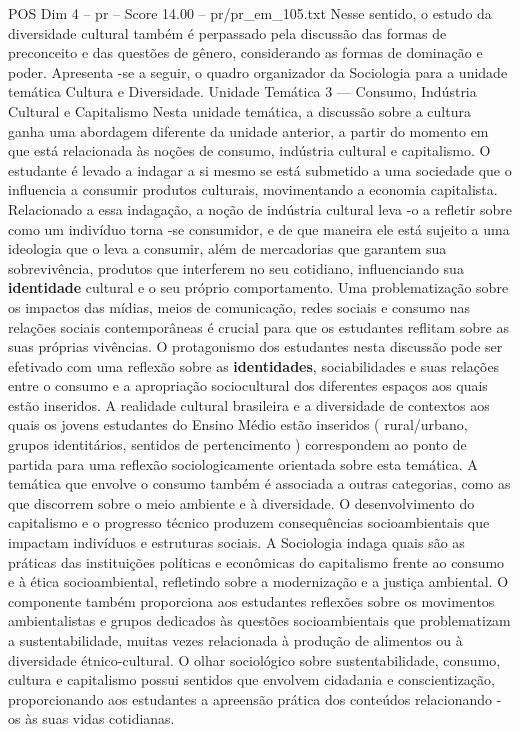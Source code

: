 \begin{textsample}{POS Dim 4 – pr – Score 14.00 – pr/pr\_em\_105.txt}
Nesse sentido, o estudo da diversidade cultural também é perpassado pela discussão das formas de preconceito e das questões de gênero, considerando as formas de dominação e poder.
Apresenta -se a seguir, o quadro organizador da Sociologia para a unidade temática Cultura e Diversidade.
Unidade Temática 3 — Consumo, Indústria Cultural e Capitalismo Nesta unidade temática, a discussão sobre a cultura ganha uma abordagem diferente da unidade anterior, a partir do momento em que está relacionada às noções de consumo, indústria cultural e capitalismo.
O estudante é levado a indagar a si mesmo se está submetido a uma sociedade que o influencia a consumir produtos culturais, movimentando a economia capitalista.
Relacionado a essa indagação, a noção de indústria cultural leva -o a refletir sobre como um indivíduo torna -se consumidor, e de que maneira ele está sujeito a uma ideologia que o leva a consumir, além de mercadorias que garantem sua sobrevivência, produtos que interferem no seu cotidiano, influenciando sua \textbf{identidade} cultural e o seu próprio comportamento.
Uma problematização sobre os impactos das mídias, meios de comunicação, redes sociais e consumo nas relações sociais contemporâneas é crucial para que os estudantes reflitam sobre as suas próprias vivências.
O protagonismo dos estudantes nesta discussão pode ser efetivado com uma reflexão sobre as \textbf{identidades}, sociabilidades e suas relações entre o consumo e a apropriação sociocultural dos diferentes espaços aos quais estão inseridos.
A realidade cultural brasileira e a diversidade de contextos aos quais os jovens estudantes do Ensino Médio estão inseridos ( rural/urbano, grupos identitários, sentidos de pertencimento ) correspondem ao ponto de partida para uma reflexão sociologicamente orientada sobre esta temática.
A temática que envolve o consumo também é associada a outras categorias, como as que discorrem sobre o meio ambiente e à diversidade.
O desenvolvimento do capitalismo e o progresso técnico produzem consequências socioambientais que impactam indivíduos e estruturas sociais.
A Sociologia indaga quais são as práticas das instituições políticas e econômicas do capitalismo frente ao consumo e à ética socioambiental, refletindo sobre a modernização e a justiça ambiental.
O componente também proporciona aos estudantes reflexões sobre os movimentos ambientalistas e grupos dedicados às questões socioambientais que problematizam a sustentabilidade, muitas vezes relacionada à produção de alimentos ou à diversidade étnico-cultural.
O olhar sociológico sobre sustentabilidade, consumo, cultura e capitalismo possui sentidos que envolvem cidadania e conscientização, proporcionando aos estudantes a apreensão prática dos conteúdos relacionando -os às suas vidas cotidianas.

\end{textsample}
